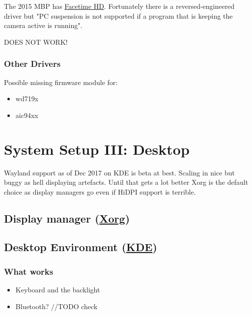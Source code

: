 The 2015 MBP has \href{https://wiki.archlinux.org/index.php/MacBook#Facetime_HD}{Facetime HD}.
Fortunately there is a reversed-engineered driver but "PC suspension is not supported if a 
program that is keeping the camera active is running".

DOES NOT WORK!


\subsubsection{Other Drivers}

Possible missing firmware module for:
\begin{itemize}[noitemsep,topsep=0pt,leftmargin=*]
    \item wd719x
    \item aic94xx
\end{itemize}


\section{System Setup III: Desktop}

Wayland support as of Dec 2017 on KDE is beta at best. Scaling in nice but buggy as hell displaying artefacts. Until that gets a lot better Xorg is the default choice as display managers go even if HiDPI support is terrible. 

\subsection{Display manager (\href{https://wiki.archlinux.org/index.php/xorg}{Xorg})}


\subsection{Desktop Environment (\href{https://wiki.archlinux.org/index.php/KDE}{KDE})}

\subsubsection{What works}

\begin{itemize}[noitemsep,topsep=0pt,leftmargin=*]
    \item Keyboard and the backlight
    \item Bluetooth? //TODO check
\end{itemize}

